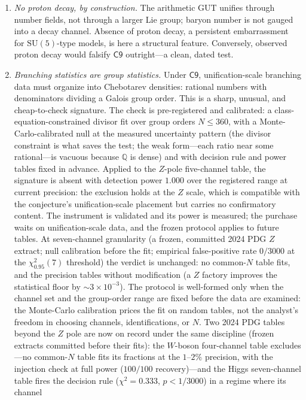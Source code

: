 \documentclass[11pt,a4paper]{article}
\theoremstyle{plain}
\theoremstyle{definition}
\theoremstyle{remark}
\newcommand{\Qq}{\mathbb{Q}}
\begin{document}
\begin{enumerate}[leftmargin=1.6em]
\item \emph{No proton decay, by construction.} The arithmetic GUT unifies through number
fields, not through a larger Lie group; baryon number is not gauged into a decay channel.
Absence of proton decay, a persistent embarrassment for $\mathrm{SU}(5)$-type models, is
here a structural feature. Conversely, observed proton decay would falsify
$\mathsf{C9}$ outright---a clean, dated test.
\item \emph{Branching statistics are group statistics.} Under $\mathsf{C9}$, unification-scale
branching data must organize into Chebotarev densities: rational numbers with denominators
dividing a Galois group order. This is a sharp, unusual, and cheap-to-check signature. The
check is pre-registered and calibrated: a class-equation-constrained divisor fit over
group orders $N\leq360$, with a Monte-Carlo-calibrated null at the measured uncertainty
pattern (the divisor constraint is what saves the test; the weak
form---each ratio near some rational---is vacuous because $\Qq$ is dense) and with decision
rule and power tables fixed in advance. Applied to the $Z$-pole five-channel table, the
signature is absent with detection power $1.000$ over the registered range at current
precision: the exclusion holds at the $Z$ scale, which is compatible with the conjecture's
unification-scale placement but carries no confirmatory content. The instrument is
validated and its power is measured; the
purchase waits on unification-scale data, and the frozen protocol applies to future
tables. At seven-channel granularity (a frozen, committed 2024 PDG $Z$ extract; null
calibration before the fit; empirical false-positive rate $0/3000$ at the
$\chi^{2}_{0.95}(7)$ threshold) the verdict is unchanged: no common-$N$ table fits, and
the
precision tables without modification (a $Z$ factory improves the statistical floor by
$\sim3\times10^{-3}$). The protocol is well-formed only when the channel
set and the group-order range are fixed before the data are examined: the Monte-Carlo
calibration prices the fit on random tables, not the analyst's freedom in choosing channels,
identifications, or $N$. Two 2024 PDG tables beyond the $Z$ pole are now on record under the
same discipline (frozen extracts committed before their fits): the $W$-boson four-channel
table excludes---no common-$N$ table fits its fractions at the $1$--$2\%$ precision, with
the injection check at full power ($100/100$ recovery)---and the Higgs seven-channel table
fires the decision rule ($\chi^{2}=0.333$, $p<1/3000$) in a regime where its channel

\end{enumerate}
\end{document}
